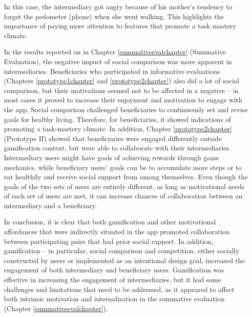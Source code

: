 In this case, the intermediary got angry because of his mother's tendency to forget the pedometer (phone) when she went walking. This highlights the importance of paying more attention to features that promote a task mastery climate.

In the results reported on in Chapter \ref{summativeevalchapter} (Summative Evaluation), the negative impact of social comparison was more apparent in intermediaries. Beneficiaries who participated in informative evaluations (Chapters \ref{prototype1chapter} and \ref{prototype2chapter}) also did a lot of social comparison, but their motivations seemed not to be affected in a negative -- in most cases it proved to increase their enjoyment and motivation to engage with the app. Social comparison challenged beneficiaries to continuously set and revise goals for healthy living. Therefore, for beneficiaries, it showed indications of promoting a task-mastery climate.  In addition, Chapter \ref{prototype2chapter} (Prototype II) showed that beneficiaries were engaged differently outside gamification context, but were able to collaborate with their intermediaries. Intermediary users might have goals of achieving rewards through game mechanics, while beneficiary users' goals can be to accumulate more steps or to eat healthily and receive social support from among themselves. Even though the goals of the two sets of users are entirely different, as long as motivational needs of each set of users are met, it can increase chances of collaboration between an intermediary and a beneficiary. 

In conclusion, it is clear that both gamification and other motivational affordances that were indirectly situated in the app promoted collaboration between participating pairs that had prior social rapport. In addition, gamification -- in particular, social comparison and competition, either socially constructed by users or implemented as an intentional design goal, increased the engagement of both intermediary and beneficiary users.
Gamification was effective in increasing the engagement of intermediaries, but it had some challenges and limitations that need to be addressed, as it appeared to affect both intrinsic motivation and internalization in the summative evaluation (Chapter \ref{summativeevalchapter}).
 
